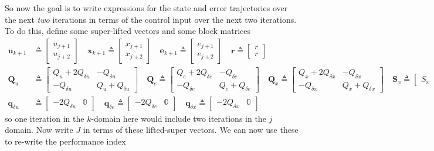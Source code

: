 \documentclass[landscape]{article}
\begin{document}
So now the goal is to write expressions for the state and error trajectories over the next \textit{two} iterations in terms of the control input over the next two iterations.  To do this, define some super-lifted vectors and some block matrices
\begin{align}
\mathbf{u}_{k+1}&\triangleq \begin{bmatrix} u_{j+1} \\ u_{j+2}\end{bmatrix} \quad
\mathbf{x}_{k+1} \triangleq \begin{bmatrix} x_{j+1} \\ x_{j+2}\end{bmatrix} \quad
\mathbf{e}_{k+1} \triangleq \begin{bmatrix} e_{j+1} \\ e_{j+2}\end{bmatrix} \quad
\mathbf{r}       \triangleq \begin{bmatrix} r       \\ r      \end{bmatrix} \\
\mathbf{Q}_u    &\triangleq \begin{bmatrix} Q_u + 2 Q_{\delta u} & - Q_{\delta u} \\ - Q_{\delta u} & Q_u + Q_{\delta u} \end{bmatrix} \quad
\mathbf{Q}_e     \triangleq \begin{bmatrix} Q_e + 2 Q_{\delta e} & - Q_{\delta e} \\ - Q_{\delta e} & Q_e + Q_{\delta e} \end{bmatrix} \quad
\mathbf{Q}_x     \triangleq \begin{bmatrix} Q_x + 2 Q_{\delta x} & - Q_{\delta x} \\ - Q_{\delta x} & Q_x + Q_{\delta x} \end{bmatrix} \quad
\mathbf{S}_x     \triangleq \begin{bmatrix} S_x  &  S_x \end{bmatrix} \quad \\
\mathbf{q}_{\delta u} &\triangleq \begin{bmatrix} -2 Q_{\delta u} & \mathbb{0} \end{bmatrix} \quad
\mathbf{q}_{\delta e}  \triangleq \begin{bmatrix} -2 Q_{\delta e} & \mathbb{0} \end{bmatrix} \quad
\mathbf{q}_{\delta x}  \triangleq \begin{bmatrix} -2 Q_{\delta x} & \mathbb{0} \end{bmatrix} \quad
\end{align}
so one iteration in the $k$-domain here would include two iterations in the $j$ domain.  Now write $J$ in terms of these lifted-super vectors.  We can now use these to re-write the performance index
\end{document}
